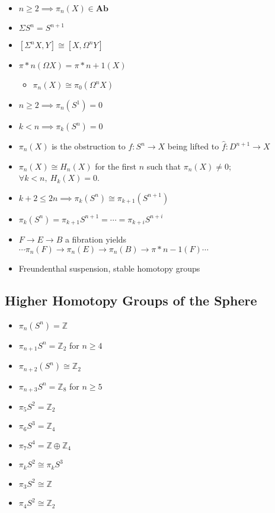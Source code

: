 \begin{itemize}
\item
  \(n \geq 2 \implies \pi_n(X) \in \mathbf{Ab}\)
\item
  \(\Sigma S^n = S^{n+1}\)
\item
  \([\Sigma^n X, Y] \cong [X, \Omega^n Y]\)
\item
  \(\pi*n(\Omega X) = \pi*{n+1}(X)\)

  \begin{itemize}
  \tightlist
  \item
    \(\pi_n(X) \cong \pi_0(\Omega^n X)\)
  \end{itemize}
\item
  \(n\geq 2 \implies \pi_n(S^1) = 0\)
\item
  \(k < n \implies \pi_k(S^n) = 0\)
\item
  \(\pi_n(X)\) is the obstruction to \(f: S^n \to X\) being lifted to
  \(\widehat{f}: D^{n+1} \to X\)
\item
  \(\pi_n(X) \cong H_n(X)\) for the first \(n\) such that
  \(\pi_n(X) \neq 0\); \(\forall k<n, ~H_k(X) = 0\).
\item
  \(k+2 \leq 2n \implies \pi_k(S^n) \cong \pi_{k+1}(S^{n+1})\)
\item
  \(\pi_k(S^n) = \pi_{k+1}S^{n+1} = \cdots =\pi_{k+i}S^{n+i}\)
\item
  \(F\to E \to B\) a fibration yields
  \(\cdots\pi_n(F) \to\pi_n(E) \to\pi_n(B) \to\pi*{n-1}(F) \cdots\)
\item
  Freundenthal suspension, stable homotopy groups
\end{itemize}

\hypertarget{higher-homotopy-groups-of-the-sphere}{%
\subsection{Higher Homotopy Groups of the
Sphere}\label{higher-homotopy-groups-of-the-sphere}}

\begin{itemize}
\tightlist
\item
  \(\pi_n(S^n) = {\mathbb{Z}}\)
\item
  \(\pi_{n+1}S^n = {\mathbb{Z}}_2\) for \(n \geq 4\)
\item
  \(\pi_{n+2}(S^n) \cong {\mathbb{Z}}_2\)
\item
  \(\pi_{n+3}S^n = {\mathbb{Z}}_8\) for \(n\geq 5\)
\item
  \(\pi_5 S^2 = {\mathbb{Z}}_2\)
\item
  \(\pi_6 S^3 = {\mathbb{Z}}_4\)
\item
  \(\pi_7 S^4 = {\mathbb{Z}}\oplus {\mathbb{Z}}_4\)
\item
  \(\pi_k S^2 \cong \pi_k S^3\)
\item
  \(\pi_3 S^2 \cong {\mathbb{Z}}\)
\item
  \(\pi_4 S^2 \cong {\mathbb{Z}}_2\)
\end{itemize}

